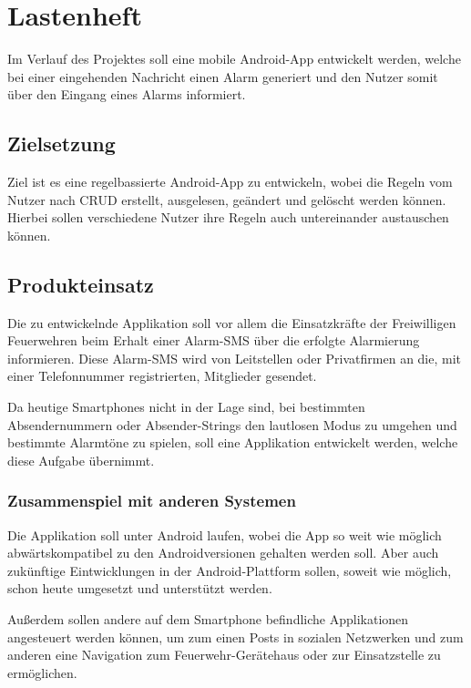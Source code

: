 \section{Lastenheft} \label{Lastenheft}
Im Verlauf des Projektes soll eine mobile Android-App entwickelt werden, welche bei einer eingehenden Nachricht einen Alarm generiert und den Nutzer somit \"uber den Eingang eines Alarms informiert.

\subsection{Zielsetzung}
Ziel ist es eine regelbassierte Android-App zu entwickeln, wobei die Regeln vom Nutzer nach CRUD erstellt, ausgelesen, ge\"andert und gel\"oscht werden k\"onnen. Hierbei sollen verschiedene Nutzer ihre Regeln auch untereinander austauschen k\"onnen.

\subsection{Produkteinsatz}
Die zu entwickelnde Applikation soll vor allem die Einsatzkr\"afte der Freiwilligen Feuerwehren beim Erhalt einer Alarm-SMS \"uber die erfolgte Alarmierung informieren. Diese Alarm-SMS wird von Leitstellen oder Privatfirmen an die, mit einer Telefonnummer registrierten, Mitglieder gesendet.

Da heutige Smartphones nicht in der Lage sind, bei bestimmten Absendernummern oder Absender-Strings den lautlosen Modus zu umgehen und bestimmte Alarmt\"one zu spielen, soll eine Applikation entwickelt werden, welche diese Aufgabe \"ubernimmt.

\subsubsection{Zusammenspiel mit anderen Systemen}
Die Applikation soll unter Android laufen, wobei die App so weit wie m\"oglich abw\"artskompatibel zu den Androidversionen gehalten werden soll. Aber auch zuk\"unftige Eintwicklungen in der Android-Plattform sollen, soweit wie m\"oglich, schon heute umgesetzt und unterst\"utzt werden.

Au\ss{}erdem sollen andere auf dem Smartphone befindliche Applikationen angesteuert werden k\"onnen, um zum einen Posts in sozialen Netzwerken und zum anderen eine Navigation zum Feuerwehr-Ger\"atehaus oder zur Einsatzstelle zu erm\"oglichen.

